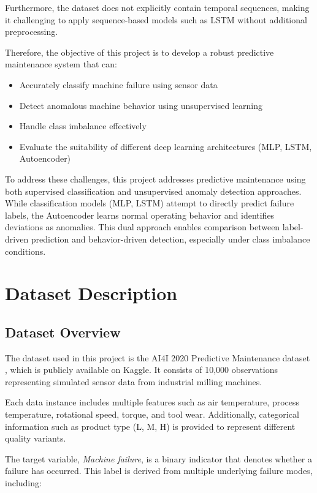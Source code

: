 \documentclass{ecsproject}     %
\begin{document}
Furthermore, the dataset does not explicitly contain temporal sequences, making it challenging to apply sequence-based models such as LSTM without additional preprocessing.

Therefore, the objective of this project is to develop a robust predictive maintenance system that can:

\begin{itemize}
    \item Accurately classify machine failure using sensor data
    \item Detect anomalous machine behavior using unsupervised learning
    \item Handle class imbalance effectively
    \item Evaluate the suitability of different deep learning architectures (MLP, LSTM, Autoencoder)
\end{itemize}

To address these challenges, this project addresses predictive maintenance using both supervised classification and unsupervised anomaly detection approaches. While classification models (MLP, LSTM) attempt to directly predict failure labels, the Autoencoder learns normal operating behavior and identifies deviations as anomalies. This dual approach enables comparison between label-driven prediction and behavior-driven detection, especially under class imbalance conditions.

\chapter{Dataset Description}
\section{Dataset Overview}

The dataset used in this project is the AI4I 2020 Predictive Maintenance dataset \cite{ai4i2020dataset}, which is publicly available on Kaggle. It consists of 10,000 observations representing simulated sensor data from industrial milling machines.

Each data instance includes multiple features such as air temperature, process temperature, rotational speed, torque, and tool wear. Additionally, categorical information such as product type (L, M, H) is provided to represent different quality variants.

The target variable, \textit{Machine failure}, is a binary indicator that denotes whether a failure has occurred. This label is derived from multiple underlying failure modes, including:
\end{document}
